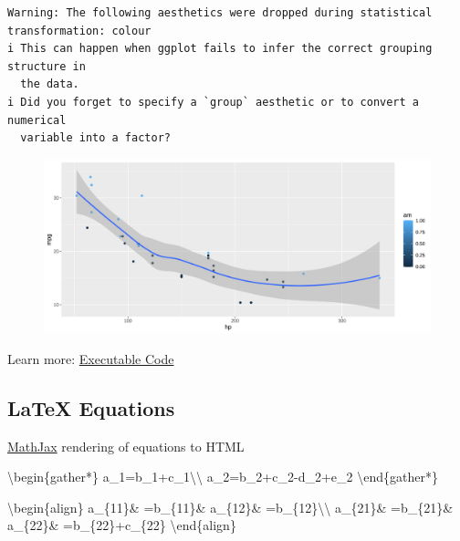 \documentclass[
  letterpaper,
  DIV=11,
  numbers=noendperiod]{scrartcl}
\newenvironment{Shaded}{\begin{snugshade}}{\end{snugshade}}
\newcommand{\ExtensionTok}[1]{\textcolor[rgb]{0.00,0.23,0.31}{#1}}
\newcommand{\KeywordTok}[1]{\textcolor[rgb]{0.00,0.23,0.31}{#1}}
\newcommand{\NormalTok}[1]{\textcolor[rgb]{0.00,0.23,0.31}{#1}}
\newcommand{\SpecialCharTok}[1]{\textcolor[rgb]{0.37,0.37,0.37}{#1}}
\newcommand{\SpecialStringTok}[1]{\textcolor[rgb]{0.13,0.47,0.30}{#1}}
\begin{document}
\begin{verbatim}
Warning: The following aesthetics were dropped during statistical transformation: colour
i This can happen when ggplot fails to infer the correct grouping structure in
  the data.
i Did you forget to specify a `group` aesthetic or to convert a numerical
  variable into a factor?
\end{verbatim}

\begin{figure}[H]

{\centering \includegraphics{index-s-curve_files/figure-pdf/unnamed-chunk-4-1.pdf}

}

\end{figure}

Learn more:
\href{https://quarto.org/docs/presentations/revealjs/\#executable-code}{Executable
Code}

\hypertarget{latex-equations}{%
\subsection{LaTeX Equations}\label{latex-equations}}

\href{https://www.mathjax.org/}{MathJax} rendering of equations to HTML

\begin{Shaded}
\begin{Highlighting}[]
\KeywordTok{\textbackslash{}begin}\NormalTok{\{}\ExtensionTok{gather*}\NormalTok{\}}
\SpecialStringTok{a\_1=b\_1+c\_1}\SpecialCharTok{\textbackslash{}\textbackslash{}}
\SpecialStringTok{a\_2=b\_2+c\_2{-}d\_2+e\_2}
\KeywordTok{\textbackslash{}end}\NormalTok{\{}\ExtensionTok{gather*}\NormalTok{\}}

\KeywordTok{\textbackslash{}begin}\NormalTok{\{}\ExtensionTok{align}\NormalTok{\}}
\SpecialStringTok{a\_\{11\}\& =b\_\{11\}\&}
\SpecialStringTok{  a\_\{12\}\& =b\_\{12\}}\SpecialCharTok{\textbackslash{}\textbackslash{}}
\SpecialStringTok{a\_\{21\}\& =b\_\{21\}\&}
\SpecialStringTok{  a\_\{22\}\& =b\_\{22\}+c\_\{22\}}
\KeywordTok{\textbackslash{}end}\NormalTok{\{}\ExtensionTok{align}\NormalTok{\}}
\end{Highlighting}
\end{Shaded}
\end{document}
